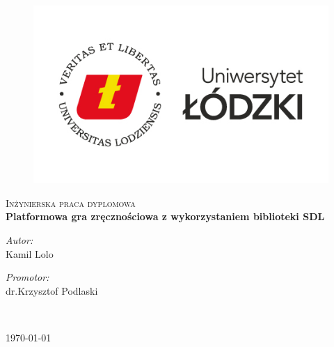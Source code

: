 \documentclass[12pt, a4paper, oneside]{Thesis} %
\begin{document}
\begin{titlepage}
\begin{center}

\begin{figure}
    \centering
    \includegraphics[width=\linewidth]{./Pictures/logo.jpg}
\end{figure}

\textsc{\Large Inżynierska praca dyplomowa \newline }\\[0.5cm] 


{\huge \bfseries Platformowa gra zręcznościowa z wykorzystaniem biblioteki SDL }\\[0.4cm] %

\addvspace{110pt}
 
\begin{minipage}{0.4\textwidth}
\begin{flushleft} \large
\emph{Autor:}\\
Kamil Lolo 
\end{flushleft}
\end{minipage}
\begin{minipage}{0.4\textwidth}
\begin{flushright} \large
\emph{Promotor:} \\
dr.Krzysztof Podlaski
\end{flushright}
\end{minipage}\\[3cm]


\vfill
\addvspace{20pt}
 
{\large \today}\\[4cm] %


\end{center}

\end{titlepage}
\end{document}
